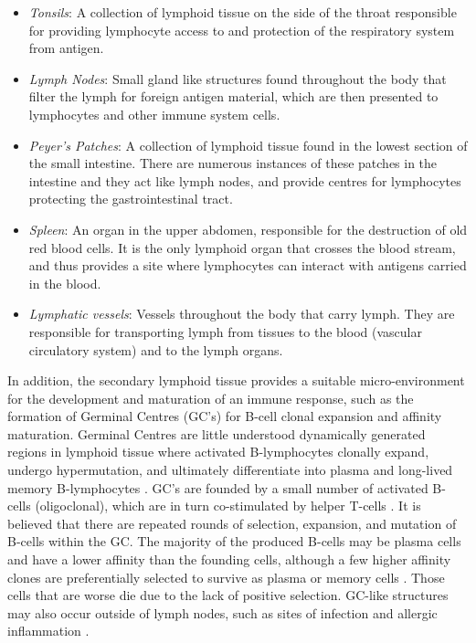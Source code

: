 \begin{itemize}
	\item \emph{Tonsils}: A collection of lymphoid tissue on the side of the throat responsible for providing lymphocyte access to and protection of the respiratory system from antigen.
	\item \emph{Lymph Nodes}: Small gland like structures found throughout the body that filter the lymph for foreign antigen material, which are then presented to lymphocytes and other immune system cells.
	\item \emph{Peyer's Patches}: A collection of lymphoid tissue found in the lowest section of the small intestine. There are numerous instances of these patches in the intestine and they act like lymph nodes, and provide centres for lymphocytes protecting the gastrointestinal tract.
	\item \emph{Spleen}: An organ in the upper abdomen, responsible for the destruction of old red blood cells. It is the only lymphoid organ that crosses the blood stream, and thus provides a site where lymphocytes can interact with antigens carried in the blood.
	\item \emph{Lymphatic vessels}: Vessels throughout the body that carry lymph. They are responsible for transporting lymph from tissues to the blood (vascular circulatory system) and to the lymph organs.
\end{itemize}

In addition, the secondary lymphoid tissue provides a suitable micro-environment for the development and maturation of an immune response, such as the formation of Germinal Centres (GC's) for B-cell clonal expansion and affinity maturation. Germinal Centres are little understood dynamically generated regions in lymphoid tissue where activated B-lymphocytes clonally expand, undergo hypermutation, and ultimately differentiate into plasma and long-lived memory B-lymphocytes \cite{Berek1991, Thorbecke1994}. GC's are founded by a small number of activated B-cells (oligoclonal), which are in turn co-stimulated by helper T-cells \cite{Liu1997}. It is believed that there are repeated rounds of selection, expansion, and mutation of B-cells within the GC. The majority of the produced B-cells may be plasma cells and have a lower affinity than the founding cells, although a few higher affinity clones are preferentially selected to survive as plasma or memory cells \cite{MacLennan1994, Meyer-Hermann2005}. Those cells that are worse die due to the lack of positive selection. GC-like structures may also occur outside of lymph nodes, such as sites of infection and allergic inflammation \cite{Gould2006}.

